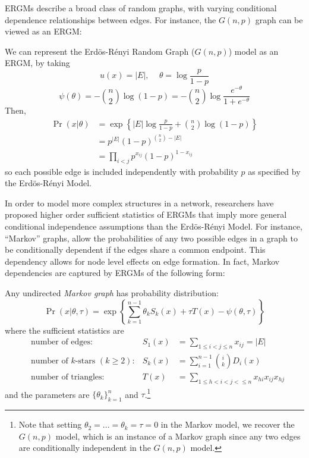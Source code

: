 ERGMs  describe a broad class of random graphs, with varying conditional dependence relationships between edges.  For instance, the $G(n,p)$ graph can be viewed as an ERGM:
 
 \begin{example}[$G(n,p)$ graphs]
 	\label{ex:ER_model}
 We can represent the Erd\"{o}s-R\'{e}nyi Random Graph ($G(n,p)$) model as an ERGM, by taking 
 $$u(x) = |E| \text{, } \quad
 \theta = \log \frac{p}{1-p}$$ %
  $$\psi(\theta)  = -\binom{n}{2} \log(1-p) = -\binom{n}{2} \log \frac{e^{-\theta}}{1+ e^{-\theta}}
  $$
  Then, 
  \begin{align*}
    \Pr(x|\theta) & = \exp\left\{ |E| \log \frac{p}{1-p} + \binom{n}{2} \log(1-p)  \right\}  \\
    & = p^{|E|} (1-p)^{\binom{n}{2} - |E|}\\
    & = \prod_{i < j} p^{x_{ij}} (1-p)^{1 - x_{ij}}
  \end{align*}
  so each possible edge is included independently with probability $p$ as specified by the Erd\"{o}s-R\'{e}nyi Model.
 \end{example}

In order to model more complex structures in a network,  researchers have proposed higher order sufficient statistics of ERGMs that imply more general conditional independence assumptions than the Erd\"{o}s-R\'{e}nyi Model. For instance,  ``Markov'' graphs, allow the probabilities of any two possible edges in a graph to be conditionally dependent if the edges share a common endpoint. This dependency allows for node level effects on edge formation. In fact, Markov dependencies are captured by ERGMs of the following form:

\begin{example}
\label{ex:markov_graphs}
Any undirected \emph{Markov graph} has probability distribution:
\begin{equation*}
\label{eqn:markov_graph}
\Pr(x | \theta, \tau) = \exp\left\{ \sum_{k = 1}^{n-1} \theta_k S_k(x) + \tau T(x) - \psi(\theta, \tau)   \right\} 
\end{equation*}
where the sufficient statistics are
\begin{align*}
&\text{number of edges:} & S_1(x)  & = \sum_{1 \leq i < j \leq n} x_{ij} = |E|\\
&\text{number of $k$-stars } (k \geq 2): & S_k(x)  & = \sum_{i=1}^{n-1} \binom{i}{k} D_i(x)\\
&\text{number of triangles: } & T(x) & = \sum_{1 \leq h < i < j < \leq n} x_{hi} x_{ij} x_{hj}
\end{align*}
and the parameters are $\{\theta_k\}_{k=1}^{n}$ and $\tau$.\footnote{Note that setting $\theta_2 = ...= \theta_k = \tau = 0$ in the Markov model, we recover the $G(n,p)$ model, which is an instance of a Markov graph since any two edges are conditionally independent in the $G(n,p)$ model.}
\end{example}

